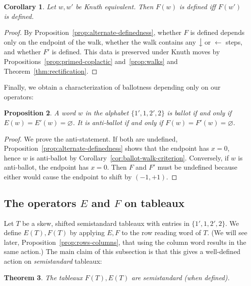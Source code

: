 \documentclass[10pt]{amsart}
\newtheorem{theorem}{Theorem}[section]
\newtheorem{prop}[theorem]{Proposition}
\newtheorem{coro}[theorem]{Corollary}
\theoremstyle{definition}
\newcommand{\west}[1]{\ensuremath{\xleftarrow{\ #1\ }}}
\newcommand{\south}[1]{\ensuremath{\big \downarrow \!\text{\raisebox{.1ex}{\scriptsize $#1$}}}}
\begin{document}
\begin{coro} \label{cor:Fdefinedness-knuth}
Let $w, w'$ be Knuth equivalent. Then $F(w)$ is defined iff $F(w')$ is defined.
\end{coro}

\begin{proof}
By Proposition~\ref{prop:alternate-definedness}, whether $F$ is defined depends only on the endpoint of the walk, whether the walk contains any $\south{}$ or $\west{}$ steps, and whether $F'$ is defined. This data is preserved under Knuth moves by Propositions~\ref{prop:primed-coplactic} and~\ref{prop:walks} and Theorem~\ref{thm:rectification}.
\end{proof}

Finally, we obtain a characterization of ballotness depending only on our operators:

\begin{prop} \label{prop:ballot-iff-killed}
A word $w$ in the alphabet $\{1',1,2',2\}$ is ballot if and only if $E(w) = E'(w) = \varnothing$. It is anti-ballot if and only if $F(w) = F'(w) = \varnothing$.
\end{prop}

\begin{proof}
We prove the anti-statement. If both are undefined, Proposition~\ref{prop:alternate-definedness} shows that the endpoint has $x=0$, hence $w$ is anti-ballot by Corollary~\ref{cor:ballot-walk-criterion}. Conversely, if $w$ is anti-ballot, the endpoint has $x=0$. Then $F$ and $F'$ must be undefined because either would cause the endpoint to shift by $(-1,+1)$.
\end{proof}

\subsection{The operators \texorpdfstring{$E$}{E} and \texorpdfstring{$F$}{F} on tableaux}

Let $T$ be a skew, shifted semistandard tableaux with entries in $\{1',1,2',2\}$. We define $E(T), F(T)$ by applying $E,F$ to the row reading word of $T$. (We will see later, Proposition~\ref{prop:rows-columns}, that using the column word results in the same action.) The main claim of this subsection is that this gives a well-defined action on \emph{semistandard} tableaux:

\begin{theorem} \label{thm:FE-semistandard}
The tableaux $F(T), E(T)$ are semistandard \textup{(}when defined\textup{)}.
\end{theorem}
\end{document}
